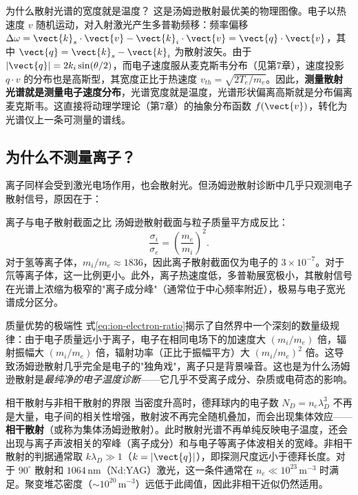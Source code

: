 \begin{insight}{为什么散射光谱的宽度就是温度？}{}{}
这是汤姆逊散射最优美的物理图像。电子以热速度 $v$ 随机运动，对入射激光产生多普勒频移：频率偏移 $\Delta\omega = \vect{k}_s\cdot\vect{v} - \vect{k}_i\cdot\vect{v} = \vect{q}\cdot\vect{v}$，其中 $\vect{q} = \vect{k}_s - \vect{k}_i$ 为散射波矢。由于 $|\vect{q}| = 2k_i\sin(\theta/2)$，而电子速度服从麦克斯韦分布（见第7章），速度投影 $q\cdot v$ 的分布也是高斯型，其宽度正比于热速度 $v_{th} = \sqrt{2T_e/m_e}$。因此，\textbf{测量散射光谱就是测量电子速度分布}，光谱宽度就是温度，光谱形状偏离高斯就是分布偏离麦克斯韦。这直接将动理学理论（第7章）的抽象分布函数 $f(\vect{v})$，转化为光谱仪上一条可测量的谱线。
\end{insight}

\subsection{为什么不测量离子？}

离子同样会受到激光电场作用，也会散射光。但汤姆逊散射诊断中几乎只观测电子散射信号，原因在于：

\begin{corollary}{离子与电子散射截面之比}{}{}
汤姆逊散射截面与粒子质量平方成反比：
\begin{equation}
\frac{\sigma_i}{\sigma_e} = \left(\frac{m_e}{m_i}\right)^2.
\label{eq:ion-electron-ratio}
\end{equation}
对于氢等离子体，$m_i/m_e \approx 1836$，因此离子散射截面仅为电子的 $3\times 10^{-7}$。对于氘等离子体，这一比例更小。此外，离子热速度低，多普勒展宽极小，其散射信号在光谱上浓缩为极窄的"离子成分峰"（通常位于中心频率附近），极易与电子宽光谱成分区分。
\end{corollary}

\begin{insight}{质量优势的极端性}{}{}
式\eqref{eq:ion-electron-ratio}揭示了自然界中一个深刻的数量级规律：由于电子质量远小于离子，电子在相同电场下的加速度大 $(m_i/m_e)$ 倍，辐射振幅大 $(m_i/m_e)$ 倍，辐射功率（正比于振幅平方）大 $(m_i/m_e)^2$ 倍。这导致汤姆逊散射几乎完全是电子的"独角戏"，离子只是背景噪音。这也是为什么汤姆逊散射是\emph{最纯净的电子温度诊断}——它几乎不受离子成分、杂质或电荷态的影响。
\end{insight}

\begin{warning}{相干散射与非相干散射的界限}{}{}
当密度升高时，德拜球内的电子数 $N_D = n_e \lambda_D^3$ 不再是大量，电子间的相关性增强，散射波不再完全随机叠加，而会出现集体效应——\textbf{相干散射}（或称为集体汤姆逊散射）。此时散射光谱不再单纯反映电子温度，还会出现与离子声波相关的窄峰（离子成分）和与电子等离子体波相关的宽峰。非相干散射的判据通常取 $k\lambda_D \gg 1$（$k = |\vect{q}|$），即探测尺度远小于德拜长度。对于 $90^\circ$ 散射和 $1064\,\mathrm{nm}$（Nd:YAG）激光，这一条件通常在 $n_e \ll 10^{23}\,\mathrm{m}^{-3}$ 时满足。聚变堆芯密度（$\sim 10^{20}\,\mathrm{m}^{-3}$）远低于此阈值，因此非相干近似仍然适用。
\end{warning}


